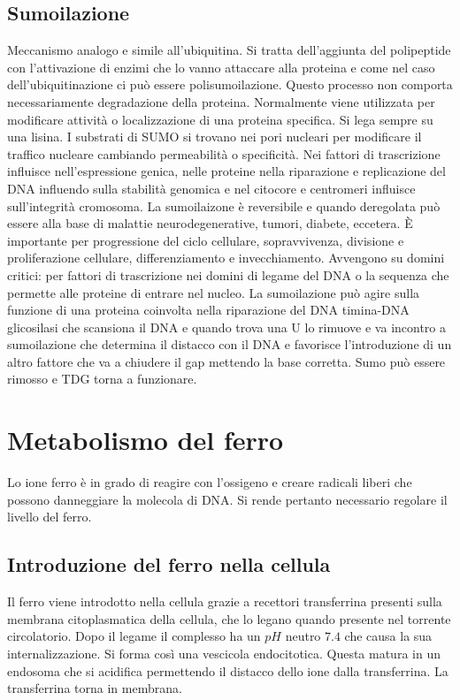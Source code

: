 	\subsection{Sumoilazione}
	Meccanismo analogo e simile all'ubiquitina. Si tratta dell'aggiunta del polipeptide con l'attivazione di enzimi che lo vanno attaccare alla proteina e come nel caso dell'ubiquitinazione
	ci pu\`o essere polisumoilazione. Questo processo non comporta necessariamente degradazione della proteina. Normalmente viene utilizzata per modificare attivit\`a o localizzazione di una
	proteina specifica. Si lega sempre su una lisina. I substrati di SUMO si trovano nei pori nucleari per modificare il traffico nucleare cambiando permeabilit\`a o specificit\`a. Nei 
	fattori di trascrizione influisce nell'espressione genica, nelle proteine nella riparazione e replicazione del DNA influendo sulla stabilit\`a genomica e nel citocore e centromeri 
	influisce sull'integrit\`a cromosoma. La sumoilaizone \`e reversibile e quando deregolata pu\`o essere alla base di malattie neurodegenerative, tumori, diabete, eccetera. \`E importante
	per progressione del ciclo cellulare, sopravvivenza, divisione e proliferazione cellulare, differenziamento e invecchiamento. Avvengono su domini critici: per fattori di trascrizione
	nei domini di legame del DNA o la sequenza che permette alle proteine di entrare nel nucleo. La sumoilazione pu\`o agire sulla funzione di una proteina coinvolta nella riparazione del
	DNA timina-DNA glicosilasi che scansiona il DNA e quando trova una U lo rimuove e va incontro a sumoilazione che determina il distacco con il DNA e favorisce l'introduzione di un altro
	fattore che va a chiudere il gap mettendo la base corretta. Sumo pu\`o essere rimosso e TDG torna a funzionare. 
		
\section{Metabolismo del ferro}
Lo ione ferro \`e in grado di reagire con l'ossigeno e creare radicali liberi che possono danneggiare la molecola di DNA.
Si rende pertanto necessario regolare il livello del ferro.

	\subsection{Introduzione del ferro nella cellula}
	Il ferro viene introdotto nella cellula grazie a recettori transferrina presenti sulla membrana citoplasmatica della cellula, che lo legano quando presente nel torrente circolatorio.
	Dopo il legame il complesso ha un $pH$ neutro $7.4$ che causa la sua internalizzazione.
	Si forma cos\`i una vescicola endocitotica.
	Questa matura in un endosoma che si acidifica permettendo il distacco dello ione dalla transferrina.
	La transferrina torna in membrana.

